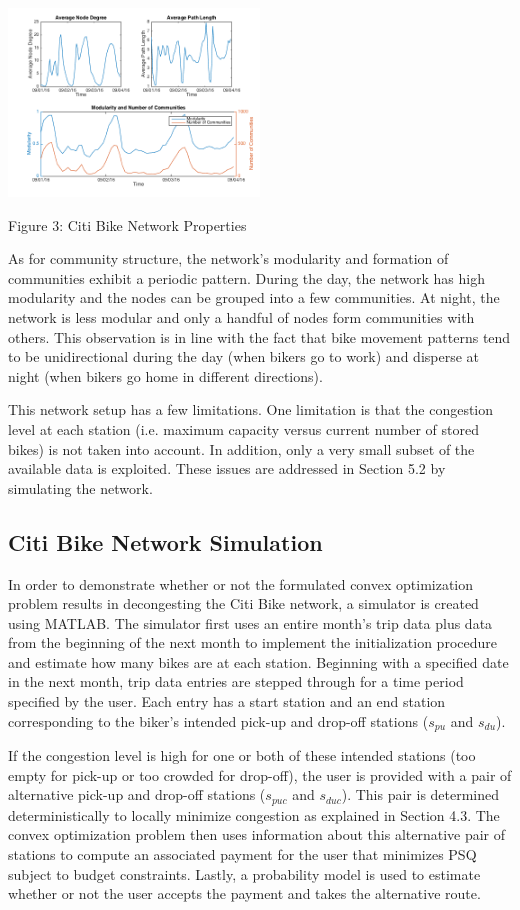 \documentclass[times, 10pt,twocolumn]{article}
\begin{document}
\centerline{\includegraphics[width=0.5\textwidth]{m4/plotterfigure.png}}
\centerline{Figure 3: Citi Bike Network Properties}
\hfill \break
\indent As for community structure, the network's modularity and formation of communities exhibit a periodic pattern. During the day, the network has high modularity and the nodes can be grouped into a few communities. At night, the network is less modular and only a handful of nodes form communities with others. This observation is in line with the fact that bike movement patterns tend to be unidirectional during the day (when bikers go to work) and disperse at night (when bikers go home in different directions).

This network setup has a few limitations. One limitation is that the congestion level at each station (i.e. maximum capacity versus current number of stored bikes) is not taken into account. In addition, only a very small subset of the available data is exploited. These issues are addressed in Section 5.2 by simulating the network.

\subsection{Citi Bike Network Simulation}

In order to demonstrate whether or not the formulated convex optimization problem results in decongesting the Citi Bike network, a simulator is created using MATLAB. The simulator first uses an entire month's trip data plus data from the beginning of the next month to implement the initialization procedure and estimate how many bikes are at each station. Beginning with a specified date in the next month, trip data entries are stepped through for a time period specified by the user. Each entry has a start station and an end station corresponding to the biker's intended pick-up and drop-off stations ($s_{pu}$ and $s_{du}$).

If the congestion level is high for one or both of these intended stations (too empty for pick-up or too crowded for drop-off), the user is provided with a pair of alternative pick-up and drop-off stations ($s_{puc}$ and $s_{duc}$). This pair is determined deterministically to locally minimize congestion as explained in Section 4.3. The convex optimization problem then uses information about this alternative pair of stations to compute an associated payment for the user that minimizes PSQ subject to budget constraints. Lastly, a probability model is used to estimate whether or not the user accepts the payment and takes the alternative route.
\end{document}

